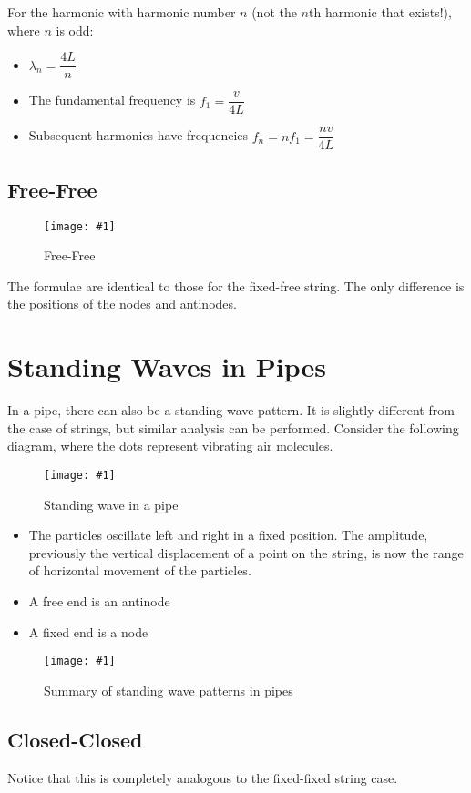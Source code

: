 \documentclass[a4paper,12pt]{article}
\let\oldsection\section
\renewcommand\section{\clearpage\oldsection}
\newcommand{\img}[4]{\begin{center}
  \begin{figure}[H]
    \centering
    \texttt{[image: \#1]}
    \caption{#3}
    \label{fig:#4}
  \end{figure}
\end{center}}
\begin{document}
For the harmonic with harmonic number $n$ (not the $n$th harmonic that exists!), where $n$ is odd:

\begin{itemize}
  \item $\lambda_n = \dfrac{4L}{n}$
  \item The fundamental frequency is $f_1 = \dfrac{v}{4L}$
  \item Subsequent harmonics have frequencies $f_n = nf_1 = \dfrac{nv}{4L}$
\end{itemize}

\pagebreak

\subsection{Free-Free}

\img{string3.png}{0.45}{Free-Free}{string3}

The formulae are identical to those for the fixed-free string. The only difference is the positions of the nodes and antinodes.

\section{Standing Waves in Pipes}

In a pipe, there can also be a standing wave pattern. It is slightly different from the case of strings, but similar analysis can be performed.
Consider the following diagram, where the dots represent vibrating air molecules.
\img{pipe.png}{0.8}{Standing wave in a pipe}{pipe}
\begin{itemize}
  \item The particles oscillate left and right in a fixed position. The amplitude, previously the vertical displacement of a point on the string, is now the range of horizontal movement of the particles.
  \item A free end is an antinode
  \item A fixed end is a node
\end{itemize}

\pagebreak

\img{pipe_summary.png}{0.95}{Summary of standing wave patterns in pipes}{pipe_summary}

\subsection{Closed-Closed}

Notice that this is completely analogous to the fixed-fixed string case.
\end{document}
